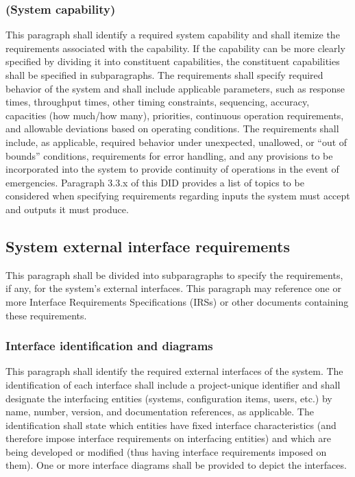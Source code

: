 \subsubsection{(System capability)}

This paragraph shall identify a required system capability and shall
itemize the requirements associated with the capability. If the
capability can be more clearly specified by dividing it into constituent
capabilities, the constituent capabilities shall be specified in
subparagraphs. The requirements shall specify required behavior of the
system and shall include applicable parameters, such as response times,
throughput times, other timing constraints, sequencing, accuracy,
capacities (how much/how many), priorities, continuous operation
requirements, and allowable deviations based on operating conditions.
The requirements shall include, as applicable, required behavior under
unexpected, unallowed, or ``out of bounds'' conditions, requirements for
error handling, and any provisions to be incorporated into the system to
provide continuity of operations in the event of emergencies. Paragraph
3.3.x of this DID provides a list of topics to be considered when
specifying requirements regarding inputs the system must accept and
outputs it must produce.

\subsection{System external interface requirements}

This paragraph shall be divided into subparagraphs to specify the
requirements, if any, for the system's external interfaces. This
paragraph may reference one or more Interface Requirements
Specifications (IRSs) or other documents containing these requirements.

\subsubsection{Interface identification and diagrams}

This paragraph shall identify the required external interfaces of the
system. The identification of each interface shall include a
project-unique identifier and shall designate the interfacing entities
(systems, configuration items, users, etc.) by name, number, version,
and documentation references, as applicable. The identification shall
state which entities have fixed interface characteristics (and therefore
impose interface requirements on interfacing entities) and which are
being developed or modified (thus having interface requirements imposed
on them). One or more interface diagrams shall be provided to depict the
interfaces.

